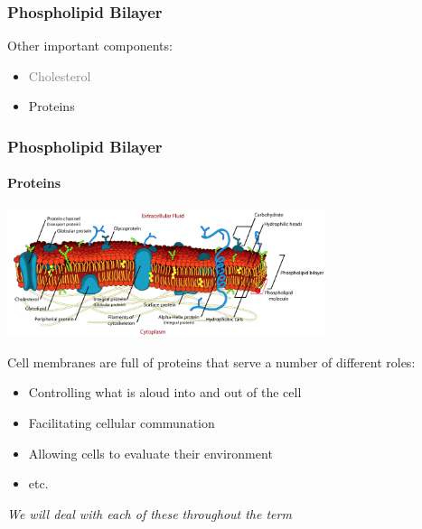 \documentclass[10pt]{beamer}
\begin{document}
\begin{frame}[t]
\frametitle{Phospholipid Bilayer}
\vspace{0.5cm}

	Other important components:
	\medskip
	
		\begin{itemize}
			\item \textcolor{gray}{Cholesterol}
			\medskip
			\item Proteins
		\end{itemize}	
\end{frame}


\begin{frame}[t]
\frametitle{Phospholipid Bilayer}
\framesubtitle{Proteins}

	\begin{center}
		\includegraphics[width=0.7\textwidth]{figures/membraneproteins.png}
	\end{center}

	Cell membranes are full of proteins that serve a number of different roles:\\
	\medskip	
	
		\begin{itemize}
			\item Controlling what is aloud into and out of the cell
			\medskip
			\item Facilitating cellular communation
			\medskip
			\item Allowing cells to evaluate their environment
			\medskip
			\item etc.
		\end{itemize}
	
	\begin{center}
		\textcolor{myblue}{\emph{We will deal with each of these throughout the term}}	
	\end{center}	
\end{frame}
\end{document}
